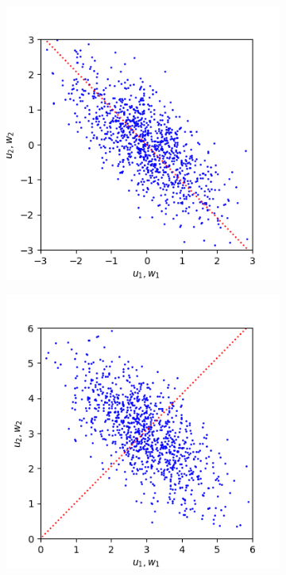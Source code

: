 \documentclass{article}
\begin{document}
\begin{figure}[h]
	\centering
	\begin{subfigure}[t]{0.30\linewidth}
		\centering
		\includegraphics[width = 1.0\linewidth, trim={0 0 0 0}, clip=true]{figures/2d_sim1.png}
		\label{fig:sim1mul}	
	\end{subfigure}%
	\hspace{0.03\linewidth}
	\begin{subfigure}[t]{0.30\linewidth}
		\centering
		\includegraphics[width = 1.0\linewidth, trim={0 0 0 0}, clip=true]{figures/2d_sim2.png}

\end{subfigure}
\end{figure}
\end{document}
